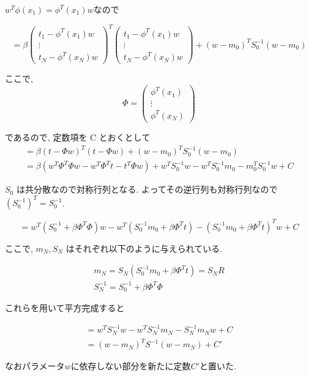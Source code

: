 \documentclass{jsarticle}
\begin{document}
$w^T\phi(x_1) = \phi^T(x_1)w$なので

\[
    = \beta \left( \begin{array}{c}
        t_1 - \phi^T(x_1)w \\
        \vdots\\
        t_N - \phi^T(x_N)w
        \end{array} \right)^T
        \left( \begin{array}{c}
        t_1 - \phi^T(x_1)w \\
        \vdots\\
        t_N - \phi^T(x_N)w
        \end{array} \right)
        + (w - m_0)^TS_0^{-1}(w - m_0)
    \]

ここで,
\[
    \Phi = \left( \begin{array}{c}
        \phi^T(x_1) \\
        \vdots\\
        \phi^T(x_N)
        \end{array} \right)
    \]

であるので, 定数項を C とおくとして
\begin{align*}
    = \beta (t - \Phi w)^T(t - \Phi w) + (w - m_0)^TS_0^{-1}(w - m_0)\\
    = \beta ( w^T\Phi^T\Phi w - w^T\Phi^Tt - t^T\Phi w ) + w^TS_0^{-1}w - w^TS_0^{-1}m_0 - m_0^TS_0^{-1}w + C
\end{align*}

$S_0$ は共分散なので対称行列となる. よってその逆行列も対称行列なので $(S_0^{-1})^T = S_0^{-1}$.

\[
    = w^T(S_0^{-1} + \beta \Phi^T\Phi)w - w^T(S_0^{-1}m_0 + \beta \Phi^T t) - (S_0^{-1}m_0 + \beta \Phi^T t)^Tw + C
\]

ここで, $m_N, S_N$ はそれぞれ以下のように与えられている.

\begin{align*}
    m_N = S_N(S_0^{-1} m_0 + \beta \Phi^Tt) = S_NR\\
    S_N^{-1} = S_0^{-1} + \beta \Phi^T \Phi
\end{align*}

これらを用いて平方完成すると

\begin{align*}
    = w^TS_N^{-1}w - w^TS_N^{-1}m_N - S_N^{-1}m_Nw + C \\
    = (w-m_N)^TS^{-1}(w-m_N) + C'
\end{align*}

なおパラメータ$w$に依存しない部分を新たに定数$C'$と置いた.
\end{document}
